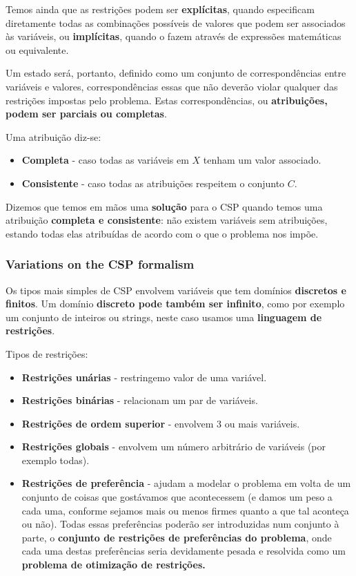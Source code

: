\documentclass[11pt]{article}
\begin{document}
Temos ainda que as restrições podem ser \textbf{explícitas}, quando especificam diretamente todas as combinações possíveis de valores que podem ser associados às variáveis, ou \textbf{implícitas}, quando o fazem através de expressões matemáticas ou equivalente.\vspace{10pt}

Um estado será, portanto, definido como um conjunto de correspondências entre variáveis e valores, correspondências essas que não deverão violar qualquer das restrições impostas pelo problema. Estas correspondências, ou \textbf{atribuições, podem ser parciais ou completas}.\vspace{4pt}

Uma atribuição diz-se:
\begin{itemize}[topsep=4pt,itemsep=0pt]
    \item \textbf{Completa} - caso todas as variáveis em $X$ tenham um valor associado.
    \item \textbf{Consistente} - caso todas as atribuições respeitem o conjunto $C$.
\end{itemize}\vspace{10pt}

Dizemos que temos em mãos uma \textbf{solução} para o CSP quando temos uma atribuição \textbf{completa e consistente}: não existem variáveis sem atribuições, estando todas elas atribuídas de acordo com o que o problema nos impõe.

\subsubsection{Variations on the CSP formalism}

Os tipos mais simples de CSP envolvem variáveis que tem domínios \textbf{discretos e finitos}. Um domínio \textbf{discreto pode também ser infinito}, como por exemplo um conjunto de inteiros ou strings, neste caso usamos uma \textbf{linguagem de restrições}.\vspace{10pt}

Tipos de restrições:
\begin{itemize}
    \item \textbf{Restrições unárias} - restringemo valor de uma variável.
    \item \textbf{Restrições binárias} - relacionam um par de variáveis.
    \item \textbf{Restrições de ordem superior} - envolvem 3 ou mais variáveis.
    \item \textbf{Restrições globais} - envolvem um número arbitrário de variáveis (por exemplo todas).
    \item \textbf{Restrições de preferência} - ajudam a modelar o problema em volta de um conjunto de coisas que gostávamos que acontecessem (e damos um peso a cada uma, conforme sejamos mais ou menos firmes quanto a que tal aconteça ou não). Todas essas preferências poderão ser introduzidas num conjunto à parte, o \textbf{conjunto de restrições de preferências do problema}, onde cada uma destas preferências seria devidamente pesada e resolvida como um \textbf{problema de otimização de restrições.}
\end{itemize}
\end{document}

